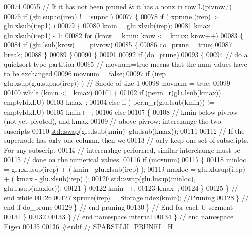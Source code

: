 \begin{DoxyCode}
00074     
00075     \textcolor{comment}{// If it has not been pruned & it has a nonz in row L(pivrow,i)}
00076     \textcolor{keywordflow}{if} (glu.supno(irep) != jsupno )
00077     \{
00078       \textcolor{keywordflow}{if} ( xprune (irep) >= glu.xlsub(irep1) )
00079       \{
00080         kmin = glu.xlsub(irep);
00081         kmax = glu.xlsub(irep1) - 1; 
00082         \textcolor{keywordflow}{for} (krow = kmin; krow <= kmax; krow++)
00083         \{
00084           \textcolor{keywordflow}{if} (glu.lsub(krow) == pivrow) 
00085           \{
00086             do\_prune = \textcolor{keyword}{true}; 
00087             \textcolor{keywordflow}{break}; 
00088           \}
00089         \}
00090       \}
00091       
00092       \textcolor{keywordflow}{if} (do\_prune) 
00093       \{
00094         \textcolor{comment}{// do a quicksort-type partition}
00095         \textcolor{comment}{// movnum=true means that the num values have to be exchanged}
00096         movnum = \textcolor{keyword}{false}; 
00097         \textcolor{keywordflow}{if} (irep == glu.xsup(glu.supno(irep)) ) \textcolor{comment}{// Snode of size 1 }
00098           movnum = \textcolor{keyword}{true}; 
00099         
00100         \textcolor{keywordflow}{while} (kmin <= kmax)
00101         \{
00102           \textcolor{keywordflow}{if} (perm\_r(glu.lsub(kmax)) == emptyIdxLU)
00103             kmax--; 
00104           \textcolor{keywordflow}{else} \textcolor{keywordflow}{if} ( perm\_r(glu.lsub(kmin)) != emptyIdxLU)
00105             kmin++;
00106           \textcolor{keywordflow}{else} 
00107           \{
00108             \textcolor{comment}{// kmin below pivrow (not yet pivoted), and kmax}
00109             \textcolor{comment}{// above pivrow: interchange the two suscripts}
00110             \hyperlink{endian_8c_a3ca5ecd34b04d6a243c054ac3a57f68d}{std::swap}(glu.lsub(kmin), glu.lsub(kmax)); 
00111             
00112             \textcolor{comment}{// If the supernode has only one column, then we }
00113             \textcolor{comment}{// only keep one set of subscripts. For any subscript}
00114             \textcolor{comment}{// intercnahge performed, similar interchange must be }
00115             \textcolor{comment}{// done on the numerical values. }
00116             \textcolor{keywordflow}{if} (movnum) 
00117             \{
00118               minloc = glu.xlusup(irep) + ( kmin - glu.xlsub(irep) ); 
00119               maxloc = glu.xlusup(irep) + ( kmax - glu.xlsub(irep) ); 
00120               \hyperlink{endian_8c_a3ca5ecd34b04d6a243c054ac3a57f68d}{std::swap}(glu.lusup(minloc), glu.lusup(maxloc)); 
00121             \}
00122             kmin++;
00123             kmax--;
00124           \}
00125         \} \textcolor{comment}{// end while }
00126         
00127         xprune(irep) = StorageIndex(kmin);  \textcolor{comment}{//Pruning }
00128       \} \textcolor{comment}{// end if do\_prune }
00129     \} \textcolor{comment}{// end pruning }
00130   \} \textcolor{comment}{// End for each U-segment}
00131 \}
00132 
00133 \} \textcolor{comment}{// end namespace internal}
00134 \} \textcolor{comment}{// end namespace Eigen}
00135 
00136 \textcolor{preprocessor}{#endif // SPARSELU\_PRUNEL\_H}
\end{DoxyCode}
